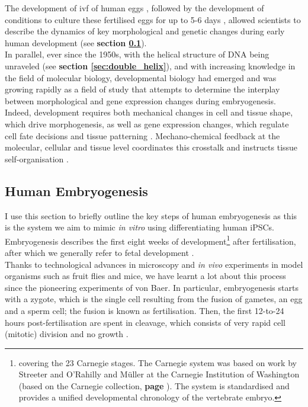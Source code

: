 The development of \gls{ivf} of human eggs \cite{edwards1969early, rock1944vitro, shettles1955morula}, followed by the development of conditions to culture these fertilised eggs for up to 5-6 days \cite{edwards1970fertilization, steptoe1971human}, allowed scientists to describe the dynamics of key morphological and genetic changes during early human development (see \textbf{section \ref{sec:human_embryogenesis}}). \\

In parallel, ever since the 1950s, with the helical structure of DNA being unraveled (see \textbf{section \ref{sec:double_helix}}), and with increasing knowledge in the field of molecular biology, developmental biology had emerged and was growing rapidly as a field of study that attempts to determine the interplay between morphological and gene expression changes during embryogenesis.
Indeed, development requires both mechanical changes in cell and tissue shape, which drive morphogenesis, as well as gene expression changes, which regulate cell fate decisions and tissue patterning \cite{niakan2013analysis, petropoulos2016single}. 
Mechano-chemical feedback at the molecular, cellular and tissue level coordinates this crosstalk and instructs tissue self-organisation \cite{hannezo2019mechanochemical}.

\newpage

\subsection{Human Embryogenesis}
\label{sec:human_embryogenesis}

I use this section to briefly outline the key steps of human embryogenesis as this is the system we aim to mimic \textit{in vitro} using differentiating human iPSCs.
Embryogenesis describes the first eight weeks of development\footnote{covering the 23 Carnegie stages.
The Carnegie system was based on work by Streeter \cite{streeter1942developmental} and O'Rahilly and Müller \cite{o1973developmental, o2010developmental} at the Carnegie Institution of Washington (based on the Carnegie collection, \textbf{page \pageref{sec:carnegie_collection}}).
The system is standardised and provides a unified developmental chronology of the vertebrate embryo.} after fertilisation, after which we generally refer to fetal development \cite{gilbert2008developmental}.\\

Thanks to technological advances in microscopy and \textit{in vivo} experiments in model organisms such as fruit flies and mice, we have learnt a lot about this process since the pioneering experiments of von Baer.
In particular, embryogenesis starts with a zygote, which is the single cell resulting from the fusion of gametes, an egg and a sperm cell; the fusion is known as fertilisation.
Then, the first 12-to-24 hours post-fertilisation are spent in cleavage, which consists of very rapid cell (mitotic) division and no growth \cite{khan2015human}.\\

